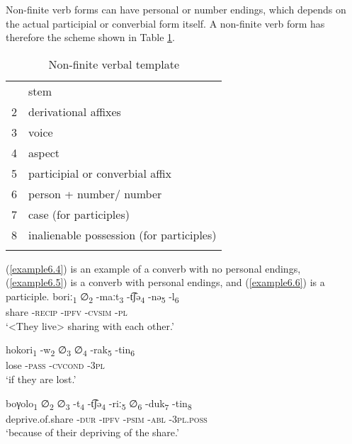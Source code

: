 \documentclass[output=paper,colorlinks,citecolor=brown]{langscibook}
\begin{document}
Non-finite verb forms can have personal or number endings, which depends on the actual participial or converbial form itself. A non-finite verb form has therefore the scheme shown in Table \ref{table:6.3}.

\begin{table}
\begin{tabular}{ ll }
\lsptoprule
1 & stem \\
2 & derivational affixes \\
3 & voice \\
4 & aspect \\
5 & participial or converbial affix \\
6 & person + number/ number \\
7 & case (for participles) \\
8 & inalienable possession (for participles)\\
\lspbottomrule
\end{tabular}
\caption{Non-finite verbal template\label{table:6.3}}
\end{table}


(\ref{example6.4}) is an example of a converb with no personal endings, (\ref{example6.5}) is a converb with personal endings, and (\ref{example6.6}) is a participle.
\ea
    \label{example6.4}
    \gll boriː\textsubscript{1}{ }    {∅}\textsubscript{2}{ }		-maːt\textsubscript{3}{ }	-t͡ʃə\textsubscript{4}{ }	-nə\textsubscript{5}{ }	-l\textsubscript{6}\\
    share   {}		\textsc{-recip}	\textsc{-ipfv}	\textsc{-cvsim}	\textsc{-pl}\\
    \glt `<They live> sharing with each other.'\\
    \z


\ea
    \label{example6.5}
    \gll hokori\textsubscript{1}{ }	-w\textsubscript{2}{ }	{∅}\textsubscript{3}{ }	{∅}\textsubscript{4}{ }	-rak\textsubscript{5}{ }	-tin\textsubscript{6}\\
    lose	\textsc{-pass}	{}	{}	\textsc{-cvcond}	-3\textsc{pl}\\
    \glt `if they are lost.'\\
    \z

\ea
    \label{example6.6}
    \gll boγolo\textsubscript{1}	{∅}\textsubscript{2}{ }	{∅}\textsubscript{3}{ }		-t\textsubscript{4}{ }	-t͡ʃə\textsubscript{4}{ }	-riː\textsubscript{5}{ } {∅}\textsubscript{6}{ }		-duk\textsubscript{7}{ }	-tin\textsubscript{8}\\
    deprive.of.share {} {}	\textsc{-dur}	\textsc{-ipfv}	\textsc{-psim} {}	\textsc{-abl}	\textsc{-3pl.poss}\\
    \glt `because of their depriving of the share.'\\
    \z
\end{document}
